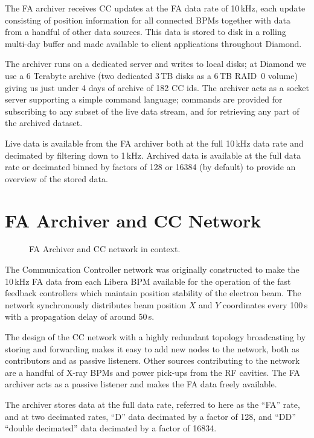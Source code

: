 \documentclass{JAC2003}
\begin{document}
The FA archiver receives CC updates at the FA data rate of 10\,kHz, each update
consisting of position information for all connected BPMs together with data
from a handful of other data sources.  This data is stored to disk in a rolling
multi-day buffer and made available to client applications throughout Diamond.

The archiver runs on a dedicated server and writes to local disks; at Diamond we
use a 6 Terabyte archive (two dedicated 3\,TB disks as a 6\,TB RAID~0 volume)
giving us just under 4\textonehalf{} days of archive of 182 CC ids.  The
archiver acts as a socket server supporting a simple command language; commands
are provided for subscribing to any subset of the live data stream, and for
retrieving any part of the archived dataset.

Live data is available from the FA archiver both at the full 10\,kHz data rate
and decimated by filtering down to 1\,kHz.  Archived data is available at the
full data rate or decimated binned by factors of 128 or 16384 (by default) to
provide an overview of the stored data.


\section{FA Archiver and CC Network}

\begin{figure}[ht]
\centering

\caption{FA Archiver and CC network in context.}
\label{context}
\end{figure}

The Communication Controller network was originally constructed to make the
10\,kHz FA data from each Libera BPM available for the operation of the fast
feedback controllers which maintain position stability of the electron beam.
The network synchronously distributes beam position $X$ and $Y$ coordinates
every 100\,\textmu s with a propagation delay of around 50\,\textmu s.

The design of the CC network with a highly redundant topology broadcasting by
storing and forwarding makes it easy to add new nodes to the network, both as
contributors and as passive listeners.  Other sources contributing to the
network are a handful of X-ray BPMs and power pick-ups from the RF cavities.
The FA archiver acts as a passive listener and makes the FA data freely
available.

The archiver stores data at the full data rate, referred to here as the ``FA''
rate, and at two decimated rates, ``D'' data decimated by a factor of 128, and
``DD'' ``double decimated'' data decimated by a factor of 16834.
\end{document}
